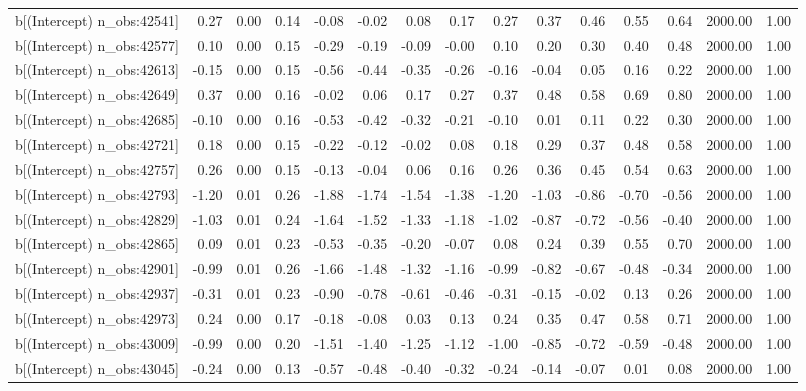 \begin{table}[ht]
\begin{tabular}{rrrrrrrrrrrrrrr}
  b[(Intercept) n\_obs:42541] & 0.27 & 0.00 & 0.14 & -0.08 & -0.02 & 0.08 & 0.17 & 0.27 & 0.37 & 0.46 & 0.55 & 0.64 & 2000.00 & 1.00 \\ 
  b[(Intercept) n\_obs:42577] & 0.10 & 0.00 & 0.15 & -0.29 & -0.19 & -0.09 & -0.00 & 0.10 & 0.20 & 0.30 & 0.40 & 0.48 & 2000.00 & 1.00 \\ 
  b[(Intercept) n\_obs:42613] & -0.15 & 0.00 & 0.15 & -0.56 & -0.44 & -0.35 & -0.26 & -0.16 & -0.04 & 0.05 & 0.16 & 0.22 & 2000.00 & 1.00 \\ 
  b[(Intercept) n\_obs:42649] & 0.37 & 0.00 & 0.16 & -0.02 & 0.06 & 0.17 & 0.27 & 0.37 & 0.48 & 0.58 & 0.69 & 0.80 & 2000.00 & 1.00 \\ 
  b[(Intercept) n\_obs:42685] & -0.10 & 0.00 & 0.16 & -0.53 & -0.42 & -0.32 & -0.21 & -0.10 & 0.01 & 0.11 & 0.22 & 0.30 & 2000.00 & 1.00 \\ 
  b[(Intercept) n\_obs:42721] & 0.18 & 0.00 & 0.15 & -0.22 & -0.12 & -0.02 & 0.08 & 0.18 & 0.29 & 0.37 & 0.48 & 0.58 & 2000.00 & 1.00 \\ 
  b[(Intercept) n\_obs:42757] & 0.26 & 0.00 & 0.15 & -0.13 & -0.04 & 0.06 & 0.16 & 0.26 & 0.36 & 0.45 & 0.54 & 0.63 & 2000.00 & 1.00 \\ 
  b[(Intercept) n\_obs:42793] & -1.20 & 0.01 & 0.26 & -1.88 & -1.74 & -1.54 & -1.38 & -1.20 & -1.03 & -0.86 & -0.70 & -0.56 & 2000.00 & 1.00 \\ 
  b[(Intercept) n\_obs:42829] & -1.03 & 0.01 & 0.24 & -1.64 & -1.52 & -1.33 & -1.18 & -1.02 & -0.87 & -0.72 & -0.56 & -0.40 & 2000.00 & 1.00 \\ 
  b[(Intercept) n\_obs:42865] & 0.09 & 0.01 & 0.23 & -0.53 & -0.35 & -0.20 & -0.07 & 0.08 & 0.24 & 0.39 & 0.55 & 0.70 & 2000.00 & 1.00 \\ 
  b[(Intercept) n\_obs:42901] & -0.99 & 0.01 & 0.26 & -1.66 & -1.48 & -1.32 & -1.16 & -0.99 & -0.82 & -0.67 & -0.48 & -0.34 & 2000.00 & 1.00 \\ 
  b[(Intercept) n\_obs:42937] & -0.31 & 0.01 & 0.23 & -0.90 & -0.78 & -0.61 & -0.46 & -0.31 & -0.15 & -0.02 & 0.13 & 0.26 & 2000.00 & 1.00 \\ 
  b[(Intercept) n\_obs:42973] & 0.24 & 0.00 & 0.17 & -0.18 & -0.08 & 0.03 & 0.13 & 0.24 & 0.35 & 0.47 & 0.58 & 0.71 & 2000.00 & 1.00 \\ 
  b[(Intercept) n\_obs:43009] & -0.99 & 0.00 & 0.20 & -1.51 & -1.40 & -1.25 & -1.12 & -1.00 & -0.85 & -0.72 & -0.59 & -0.48 & 2000.00 & 1.00 \\ 
  b[(Intercept) n\_obs:43045] & -0.24 & 0.00 & 0.13 & -0.57 & -0.48 & -0.40 & -0.32 & -0.24 & -0.14 & -0.07 & 0.01 & 0.08 & 2000.00 & 1.00 \\ 

\end{tabular}
\end{table}

